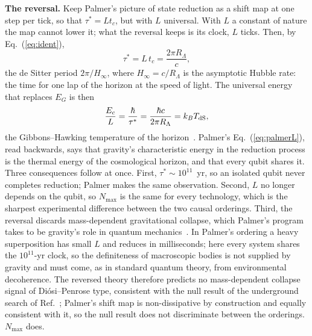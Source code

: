 \documentclass[aps,prd,twocolumn,superscriptaddress,nofootinbib,showkeys]{revtex4-2}
\newcommand{\tc}{t_c}
\newcommand{\Ec}{E_c}
\newcommand{\RL}{R_\Lambda}
\begin{document}
\textbf{The reversal.} Keep Palmer's picture of state reduction as a shift map at one step per tick, so that $\tau^* = L\tc$, but with $L$ universal. With $L$ a constant of nature the map cannot lower it; what the reversal keeps is its clock, $L$ ticks. Then, by Eq.~(\ref{eq:ident}),
\begin{equation}
\tau^* = L\,\tc = \frac{2\pi\RL}{c} ,
\label{eq:clock}
\end{equation}
the de Sitter period $2\pi/H_\infty$, where $H_\infty = c/\RL$ is the asymptotic Hubble rate: the time for one lap of the horizon at the speed of light. The universal energy that replaces $E_G$ is then
\begin{equation}
\frac{\Ec}{L} = \frac{\hbar}{\tau^*} = \frac{\hbar c}{2\pi\RL} = k_B T_{\rm dS},
\label{eq:energy}
\end{equation}
the Gibbons--Hawking temperature of the horizon~\cite{gibbons1977}. Palmer's Eq.~(\ref{eq:palmerL}), read backwards, says that gravity's characteristic energy in the reduction process is the thermal energy of the cosmological horizon, and that every qubit shares it. Three consequences follow at once. First, $\tau^*\sim10^{11}$~yr, so an isolated qubit never completes reduction; Palmer makes the same observation. Second, $L$ no longer depends on the qubit, so $N_{\max}$ is the same for every technology, which is the sharpest experimental difference between the two causal orderings. Third, the reversal discards mass-dependent gravitational collapse, which Palmer's program takes to be gravity's role in quantum mechanics~\cite{palmer2016,hance2025}. In Palmer's ordering a heavy superposition has small $L$ and reduces in milliseconds; here every system shares the $10^{11}$-yr clock, so the definiteness of macroscopic bodies is not supplied by gravity and must come, as in standard quantum theory, from environmental decoherence. The reversed theory therefore predicts no mass-dependent collapse signal of Di\'osi--Penrose type, consistent with the null result of the underground search of Ref.~\cite{donadi2021}; Palmer's shift map is non-dissipative by construction and equally consistent with it, so the null result does not discriminate between the orderings. $N_{\max}$ does.
\end{document}
